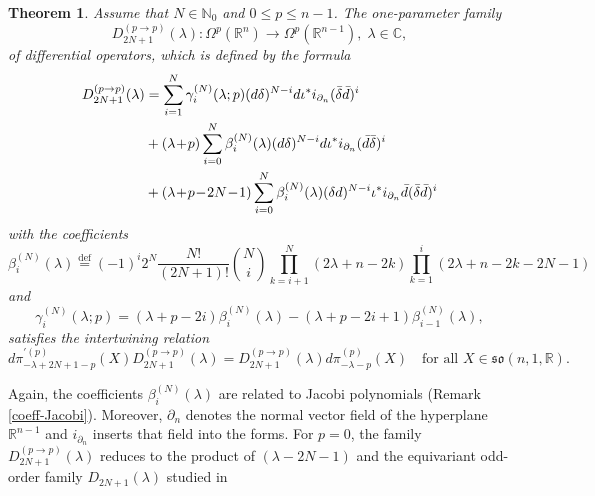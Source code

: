 \documentclass[a4paper,12pt,reqno]{amsart}
\newtheorem{thm}{Theorem}
\numberwithin{theorem}{subsection}
\numberwithin{equation}{section}
\begin{document}
\begin{thm}\label{main-odd} Assume that $N \in {\mathbb{N}}_0$ and $0 \le p \le n-1$. The
one-parameter family
\begin{equation*}
   D_{2N+1}^{(p \to p)}(\lambda): \Omega^p({\mathbb{R}}^n) \to \Omega^p({\mathbb{R}}^{n-1}), \; \lambda \in {\mathbb{C}},
\end{equation*}
of differential operators, which is defined by the formula
\begin{align}\label{SBO-odd-0}
   D_{2N+1}^{(p \to p)}(\lambda) & = \sum_{i=1}^N  \gamma_i^{(N)}(\lambda;p)({d} \delta)^{N-i}{d} \iota^* i_{\partial_n}
   (\bar{\delta}\bar{d})^i \notag \\
   & + (\lambda\!+\!p) \sum_{i=0}^N  \beta_i^{(N)}(\lambda)
   ({d}\delta)^{N-i}{d} \iota^* i_{\partial_n}(\bar{d}\bar{\delta})^i \notag \\
   & + (\lambda\!+\!p\!-\!2N\!-\!1) \sum_{i=0}^{N}  \beta_i^{(N)}(\lambda) (\delta{d})^{N-i}
   \iota^* i_{\partial_n} \bar{d}(\bar{\delta}\bar{d})^i
\end{align}
with the coefficients
\begin{equation}
   \beta_i^{(N)}(\lambda) {\stackrel{\text{def}}{=}} (-1)^i 2^N \frac{N!}{(2N\!+\!1)!} \binom{N}{i}
   \prod_{k=i+1}^N (2\lambda\!+\!n\!-\!2k) \prod_{k=1}^i (2\lambda\!+\!n\!-\!2k\!-\!2N\!-\!1)
\end{equation}
and
\begin{equation}
   \gamma_i^{(N)}(\lambda;p) = (\lambda\!+\!p\!-\!2i) \beta_i^{(N)}(\lambda) -(\lambda\!+\!p\!-\!2i\!+\!1)
   \beta_{i-1}^{(N)}(\lambda),
\end{equation}
satisfies the intertwining relation
\begin{equation}\label{inter-odd}
   {d}\pi^{\prime (p)}_{-\lambda+2N+1-p}(X) D_{2N+1}^{(p \to p)}(\lambda) =
   D_{2N+1}^{(p \to p)}(\lambda) {d}\pi_{-\lambda-p}^{(p)}(X) \quad
   \mbox{for all $X \in \mathfrak{so}(n,1,{\mathbb{R}})$}.
\end{equation}
\end{thm}

Again, the coefficients $\beta_i^{(N)}(\lambda)$ are related to Jacobi
polynomials (Remark \ref{coeff-Jacobi}). Moreover, $\partial_n$ denotes the
normal vector field of the hyperplane ${\mathbb{R}}^{n-1}$ and $i_{\partial_n}$ inserts
that field into the forms. For $p=0$, the family $D_{2N+1}^{(p \to
p)}(\lambda)$ reduces to the product of $(\lambda-2N-1)$ and the equivariant
odd-order family $D_{2N+1}(\lambda)$ studied in \cite{Juhl}
\end{document}

